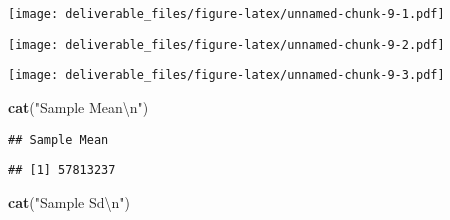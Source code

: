 \documentclass[]{article}
\newenvironment{Shaded}{\begin{snugshade}}{\end{snugshade}}
\newcommand{\KeywordTok}[1]{\textcolor[rgb]{0.13,0.29,0.53}{\textbf{#1}}}
\newcommand{\DataTypeTok}[1]{\textcolor[rgb]{0.13,0.29,0.53}{#1}}
\newcommand{\CharTok}[1]{\textcolor[rgb]{0.31,0.60,0.02}{#1}}
\newcommand{\StringTok}[1]{\textcolor[rgb]{0.31,0.60,0.02}{#1}}
\newcommand{\CommentTok}[1]{\textcolor[rgb]{0.56,0.35,0.01}{\textit{#1}}}
\newcommand{\OperatorTok}[1]{\textcolor[rgb]{0.81,0.36,0.00}{\textbf{#1}}}
\newcommand{\NormalTok}[1]{#1}
\begin{document}
\begin{Shaded}
\end{Shaded}

\texttt{[image: deliverable\_files/figure-latex/unnamed-chunk-9-1.pdf]}

\begin{Shaded}
\end{Shaded}

\texttt{[image: deliverable\_files/figure-latex/unnamed-chunk-9-2.pdf]}

\begin{Shaded}
\end{Shaded}

\texttt{[image: deliverable\_files/figure-latex/unnamed-chunk-9-3.pdf]}

\begin{Shaded}
\begin{Highlighting}[]
\KeywordTok{cat}\NormalTok{(}\StringTok{"Sample Mean}\CharTok{\textbackslash{}n}\StringTok{"}\NormalTok{)}
\end{Highlighting}
\end{Shaded}

\begin{verbatim}
## Sample Mean
\end{verbatim}

\begin{Shaded}
\end{Shaded}

\begin{verbatim}
## [1] 57813237
\end{verbatim}

\begin{Shaded}
\begin{Highlighting}[]
\KeywordTok{cat}\NormalTok{(}\StringTok{"Sample Sd}\CharTok{\textbackslash{}n}\StringTok{"}\NormalTok{)}
\end{Highlighting}
\end{Shaded}
\end{document}
